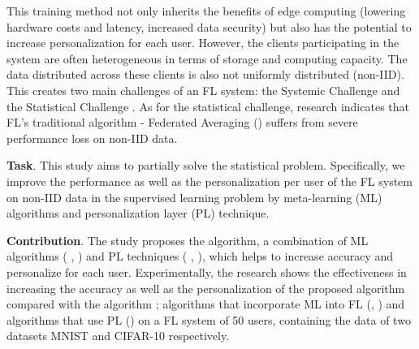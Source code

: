 \documentclass[runningheads]{llncs}
\begin{document}
This training method not only inherits the benefits of edge computing (lowering hardware costs and latency, increased data security) but also has the potential to increase personalization for each user. However, the clients participating in the system are often heterogeneous in terms of storage and computing capacity. The data distributed across these clients is also not uniformly distributed (non-IID). This creates two main challenges of an FL system: the Systemic Challenge and the Statistical Challenge \cite{li2020federated}. As for the statistical challenge, \cite{zhao2018federated} research indicates that FL's traditional algorithm - Federated Averaging () suffers from severe performance loss on non-IID data.

\textbf{Task}. This study aims to partially solve the statistical problem. Specifically, we improve the performance as well as the personalization per user of the FL system on non-IID data in the supervised learning problem by meta-learning (ML) algorithms \cite{hospedales2020meta} and personalization layer (PL) technique.

\textbf{Contribution}. The study proposes the  algorithm, a combination of ML algorithms ( \cite{finn2017model},  \cite{li2017meta}) and PL techniques ( \cite{arivazhagan2019federated},  \cite{liang2020think}), which helps to increase accuracy and personalize for each user. Experimentally, the research shows the effectiveness in increasing the accuracy as well as the personalization of the proposed algorithm compared with the algorithm ; algorithms that incorporate ML into FL \cite{chen2018federated} (, ) and algorithms that use PL () on a FL system of 50 users, containing the data of two datasets MNIST \cite{deng2012mnist} and CIFAR-10 \cite{krizhevsky2009learning} respectively.
\end{document}

